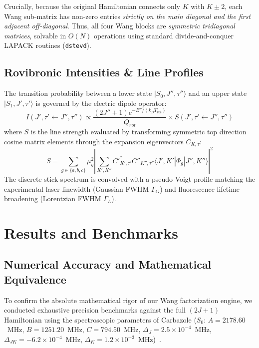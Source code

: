 \documentclass[aps,jcp,reprint,twocolumn,superscriptaddress,showpacs,amsmath,amssymb]{revtex4-2}
\begin{document}
Crucially, because the original Hamiltonian connects only $K$ with $K \pm 2$, each Wang sub-matrix has non-zero entries \textit{strictly on the main diagonal and the first adjacent off-diagonal}. Thus, all four Wang blocks are \textit{symmetric tridiagonal matrices}, solvable in $O(N)$ operations using standard divide-and-conquer LAPACK routines (\texttt{dstevd}).

\subsection{Rovibronic Intensities \& Line Profiles}
The transition probability between a lower state $|S_0, J'', \tau''\rangle$ and an upper state $|S_1, J', \tau'\rangle$ is governed by the electric dipole operator:
\begin{equation}
I(J', \tau' \leftarrow J'', \tau'') \propto \frac{(2J'' + 1) e^{-E'' / (k_B T_{rot})}}{Q_{rot}} \times S(J', \tau' \leftarrow J'', \tau'')
\end{equation}
where $S$ is the line strength evaluated by transforming symmetric top direction cosine matrix elements through the expansion eigenvectors $C_{K, \tau}$:
\begin{equation}
S = \sum_{g \in \{a, b, c\}} \mu_g^2 \left| \sum_{K', K''} C'^*_{K', \tau'} C''_{K'', \tau''} \langle J', K' | \Phi_g | J'', K'' \rangle \right|^2
\end{equation}
The discrete stick spectrum is convolved with a pseudo-Voigt profile matching the experimental laser linewidth (Gaussian FWHM $\Gamma_G$) and fluorescence lifetime broadening (Lorentzian FWHM $\Gamma_L$).

\section{Results and Benchmarks}

\subsection{Numerical Accuracy and Mathematical Equivalence}
To confirm the absolute mathematical rigor of our Wang factorization engine, we conducted exhaustive precision benchmarks against the full $(2J+1)$ Hamiltonian using the spectroscopic parameters of Carbazole ($S_0$: $A=2178.60$~MHz, $B=1251.20$~MHz, $C=794.50$~MHz, $\Delta_J=2.5\times 10^{-4}$~MHz, $\Delta_{JK}=-6.2\times 10^{-4}$~MHz, $\Delta_K=1.2\times 10^{-3}$~MHz)~\cite{alvarez2006rotationally}.
\end{document}
